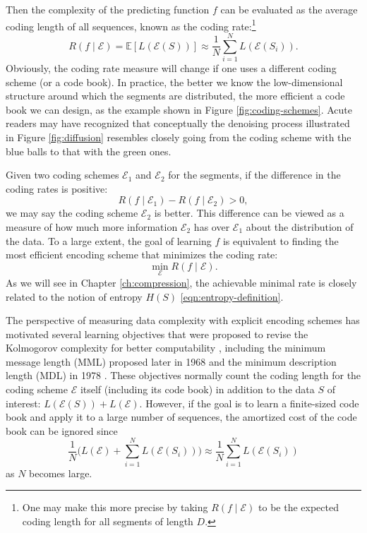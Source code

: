 \documentclass[../../book-main.tex]{subfiles}
\begin{document}
Then the complexity of the predicting function $f$ can be evaluated as the average coding length of all sequences, known as the coding rate:\footnote{One may make this more precise by taking $R(f\mid \mathcal{E})$ to be the expected coding length for all segments of length $D$. }
\begin{equation}
   R(f \mid \mathcal E) = \mathbb{E}[L(\mathcal{E}(S))] \approx \frac{1}{N}\sum_{i=1}^N L(\mathcal{E}(S_i)). 
   \label{eqn:coding-rate}
\end{equation}
Obviously, the coding rate measure will change if one uses a different coding  scheme (or a code book). In practice, the better we know the low-dimensional structure around which the segments are distributed, the more efficient a code book we can design, as the example shown in Figure \ref{fig:coding-schemes}. Acute readers may have recognized that conceptually the denoising process illustrated in Figure \ref{fig:diffusion} resembles closely going from the coding scheme with the blue balls to that with the green ones.


Given two coding schemes $\mathcal{E}_1$ and $\mathcal{E}_2$ for the segments, if the difference in the coding rates is positive:
\begin{equation}
   R(f \mid \mathcal E_1) -  R(f \mid \mathcal E_2) > 0, 
\end{equation}
we may say the coding scheme $\mathcal{E}_2$ is better. This difference can be viewed as a measure of how much more information $\mathcal{E}_2$ has over $\mathcal{E}_1$ about the distribution of the data. To a large extent, the goal of learning $f$ is equivalent to finding the most efficient encoding scheme that minimizes the coding rate:
\begin{equation}
   \min_{\mathcal{E}} R(f \mid \mathcal E). 
\end{equation}
As we will see in Chapter \ref{ch:compression}, the achievable minimal rate is closely related to the notion of entropy $H(S)$ \eqref{eqn:entropy-definition}. 


\begin{remark}\label{rem:computable-complexity}
    {The perspective of measuring data complexity with explicit encoding schemes has motivated several learning objectives that were proposed to revise the Kolmogorov complexity for better computability \cite{WallaceC1999}, including the minimum message length (MML) proposed later in 1968 \cite{WallaceC1968} and the minimum description length (MDL) in 1978 \cite{Rissanen-1978,HansenM2001}. These objectives normally count the coding length for the coding scheme $\mathcal{E}$ itself (including its code book) in addition to the data $S$ of interest: $L(\mathcal E(S)) + L(\mathcal E)$.  However, if the goal is to learn a finite-sized code book and apply it to a large number of sequences, the amortized cost of the code book can be ignored since $$\frac{1}{N}\Big( L(\mathcal{E}) + \sum_{i=1}^N L(\mathcal{E}(S_i))\Big) \approx \frac{1}{N}\sum_{i=1}^N L(\mathcal{E}(S_i))$$ as $N$ becomes large.}
\end{remark}
\end{document}

